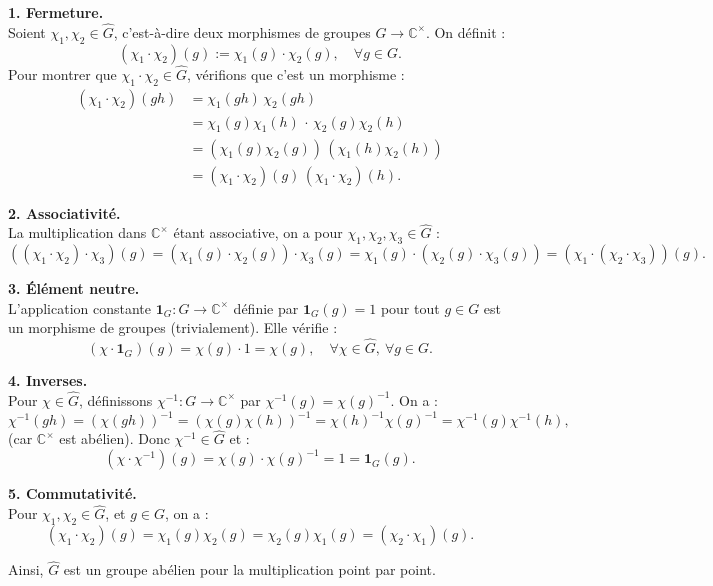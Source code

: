 \documentclass[a4paper, 14pt]{report}
\begin{document}
\begin{onehalfspace}
{	\textbf{1. Fermeture.}\\
Soient \( \chi_1, \chi_2 \in \widehat{G} \), c’est-à-dire deux morphismes de groupes \( G \to \mathbb{C}^\times \). On définit :
\[
(\chi_1 \cdot \chi_2)(g) := \chi_1(g) \cdot \chi_2(g), \quad \forall g \in G.
\]
Pour montrer que \( \chi_1 \cdot \chi_2 \in \widehat{G} \), vérifions que c’est un morphisme :
\begin{align*}
	(\chi_1 \cdot \chi_2)(gh) 
	&= \chi_1(gh)\, \chi_2(gh) \\
	&= \chi_1(g)\chi_1(h)\, \cdot\, \chi_2(g)\chi_2(h) \\
	&= (\chi_1(g)\chi_2(g))\, (\chi_1(h)\chi_2(h)) \\
	&= (\chi_1 \cdot \chi_2)(g)\, (\chi_1 \cdot \chi_2)(h).
\end{align*}


\textbf{2. Associativité.} \\
La multiplication dans \( \mathbb{C}^\times \) étant associative, on a pour \( \chi_1, \chi_2, \chi_3 \in \widehat{G} \) :
\[
((\chi_1 \cdot \chi_2) \cdot \chi_3)(g)
= (\chi_1(g) \cdot \chi_2(g)) \cdot \chi_3(g)
= \chi_1(g) \cdot (\chi_2(g) \cdot \chi_3(g))
= (\chi_1 \cdot (\chi_2 \cdot \chi_3))(g).
\]

\textbf{3. Élément neutre.} \\
L’application constante \( \mathbf{1}_G : G \to \mathbb{C}^\times \) définie par \( \mathbf{1}_G(g) = 1 \) pour tout \( g \in G \) est un morphisme de groupes (trivialement). Elle vérifie :
\[
(\chi \cdot \mathbf{1}_G)(g) = \chi(g) \cdot 1 = \chi(g), \quad \forall \chi \in \widehat{G}, \ \forall g \in G.
\]

\textbf{4. Inverses.} \\
Pour \( \chi \in \widehat{G} \), définissons \( \chi^{-1} : G \to \mathbb{C}^\times \) par \( \chi^{-1}(g) = \chi(g)^{-1} \). On a :
\[
\chi^{-1}(gh) = (\chi(gh))^{-1} = (\chi(g)\chi(h))^{-1} = \chi(h)^{-1} \chi(g)^{-1} = \chi^{-1}(g)\chi^{-1}(h),
\]
(car \( \mathbb{C}^\times \) est abélien). Donc \( \chi^{-1} \in \widehat{G} \) et :
\[
(\chi \cdot \chi^{-1})(g) = \chi(g) \cdot \chi(g)^{-1} = 1 = \mathbf{1}_G(g).
\]

\textbf{5. Commutativité.}\\
 Pour \( \chi_1, \chi_2 \in \widehat{G} \), et \( g \in G \), on a :
\[
(\chi_1 \cdot \chi_2)(g) = \chi_1(g)\chi_2(g) = \chi_2(g)\chi_1(g) = (\chi_2 \cdot \chi_1)(g).
\]

\noindent
Ainsi, \( \widehat{G} \) est un groupe abélien pour la multiplication point par point.



}
\end{onehalfspace}
\end{document}
